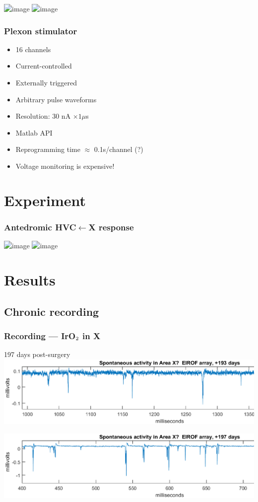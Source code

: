 \documentclass{beamer}
\begin{document}
\begin{frame}[plain]
  \includegraphics<+>[width=\textwidth]{CFHistSplayFronSanneImg1}
  \includegraphics<+>[width=\textwidth]{CFHistSplayFronSanneImg2}
\end{frame}


\begin{frame}
  \frametitle{Plexon stimulator}
  \begin{itemize}
    \item 16 channels
    \item Current-controlled
    \item Externally triggered
    \item Arbitrary pulse waveforms
    \item Resolution: 30 nA $\times 1 \mu$s
    \item Matlab API
    \item Reprogramming time $\approx$ 0.1s/channel (?)
    \item Voltage monitoring is expensive!
  \end{itemize}
\end{frame}

\section{Experiment}

\begin{frame}
  \frametitle{Antedromic HVC$\leftarrow$X response}
  \includegraphics<+>[width=\textwidth]{hvc_areaX}
  \includegraphics<+>[width=\textwidth]{plexme}
\end{frame}

\section{Results}

\subsection{Chronic recording}

\begin{frame}
  \frametitle{Recording --- IrO$\textsubscript{2}$ in X}
  197 days post-surgery
  \includegraphics[width=\textwidth]{spiketrain-lw95rhp-2015-11-19}
  
  \includegraphics[width=\textwidth]{spiketrain-lw95rhp-2015-11-23}
\end{frame}
\end{document}
